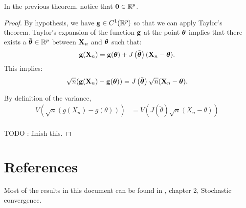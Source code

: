 \documentclass{article}
\begin{document}
In the previous theorem, notice that ${\bf 0}\in\mathbb{R}^p$. 

\begin{proof}
By hypothesis, we have ${\bf g}\in C^1(\mathbb{R}^p)$ so that we can apply Taylor's theorem. 
Taylor's expansion of the function ${\bf g}$ at the point $\boldsymbol{\theta}$ implies that there exists a $\tilde{\boldsymbol{\theta}}\in \mathbb{R}^p$ between 
${\bf X}_n$ and $\boldsymbol{\theta}$ such that:
$$
{\bf g}({\bf X}_n) = {\bf g}(\boldsymbol{\theta}) + J\left(\tilde{\boldsymbol{\theta}}\right) ({\bf X}_n-\boldsymbol{\theta}).
$$
This implies:
\begin{align}
\label{eq-multivdelmeth2}
\sqrt{n} ({\bf g}({\bf X}_n) - {\bf g}(\boldsymbol{\theta})) = J\left(\tilde{\boldsymbol{\theta}}\right) \sqrt{n} ({\bf X}_n-\boldsymbol{\theta}).
\end{align}

By definition of the variance, 
\begin{align*}
V\left(\sqrt{n} (g(X_n) - g(\theta))\right) 
&= V\left(J\left(\tilde{\theta}\right) \sqrt{n} (X_n-\theta) \right) \\
\end{align*}

TODO : finish this.
\end{proof}


\section{References}

Most of the results in this document can be found in \cite{Vaart2000}, chapter 2, Stochastic convergence.





\end{document}
